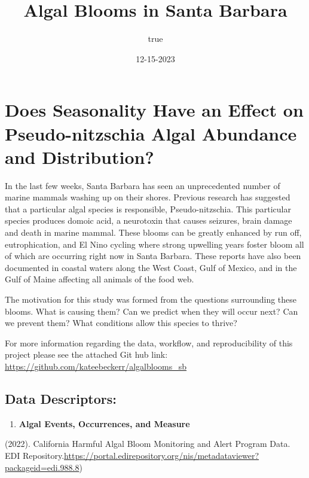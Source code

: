 \documentclass[
]{article}
\title{Algal Blooms in Santa Barbara}
\author{true}
\date{12-15-2023}
\providecommand{\tightlist}{%
  \setlength{\itemsep}{0pt}\setlength{\parskip}{0pt}}
\begin{document}
\maketitle

\hypertarget{does-seasonality-have-an-effect-on-pseudo-nitzschia-algal-abundance-and-distribution}{%
\section{Does Seasonality Have an Effect on Pseudo-nitzschia Algal
Abundance and
Distribution?}\label{does-seasonality-have-an-effect-on-pseudo-nitzschia-algal-abundance-and-distribution}}

In the last few weeks, Santa Barbara has seen an unprecedented number of
marine mammals washing up on their shores. Previous research has
suggested that a particular algal species is responsible,
Pseudo-nitzschia. This particular species produces domoic acid, a
neurotoxin that causes seizures, brain damage and death in marine
mammal. These blooms can be greatly enhanced by run off, eutrophication,
and El Nino cycling where strong upwelling years foster bloom all of
which are occurring right now in Santa Barbara. These reports have also
been documented in coastal waters along the West Coast, Gulf of Mexico,
and in the Gulf of Maine affecting all animals of the food web.

The motivation for this study was formed from the questions surrounding
these blooms. What is causing them? Can we predict when they will occur
next? Can we prevent them? What conditions allow this species to thrive?

For more information regarding the data, workflow, and reproducibility
of this project please see the attached Git hub link:
\url{https://github.com/kateebeckerr/algalblooms_sb}

\hypertarget{data-descriptors}{%
\subsection{Data Descriptors:}\label{data-descriptors}}

\begin{enumerate}
\def\labelenumi{\arabic{enumi}.}
\tightlist
\item
  \textbf{Algal Events, Occurrences, and Measure}
\end{enumerate}

(2022). California Harmful Algal Bloom Monitoring and Alert Program
Data. EDI
Repository.\url{https://portal.edirepository.org/nis/metadataviewer?packageid=edi.988.8})
\end{document}
